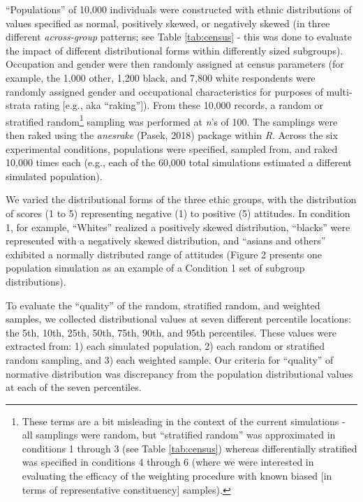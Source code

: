 \documentclass[
  ,man]{apa7}
\begin{document}
``Populations'' of 10,000 individuals were constructed with ethnic distributions of values specified as normal, positively skewed, or negatively skewed (in three different \emph{across-group} patterns; see Table \ref{tab:census} - this was done to evaluate the impact of different distributional forms within differently sized subgroups). Occupation and gender were then randomly assigned at census parameters (for example, the 1,000 other, 1,200 black, and 7,800 white respondents were randomly assigned gender and occupational characteristics for purposes of multi-strata rating {[}e.g., aka ``raking''{]}). From these 10,000 records, a random or stratified random\footnote{These terms are a bit misleading in the context of the current simulations - all samplings were random, but ``stratified random'' was approximated in conditions 1 through 3 (see Table \ref{tab:census}) whereas differentially stratified was specified in conditions 4 through 6 (where we were interested in evaluating the efficacy of the weighting procedure with known biased {[}in terms of representative constituency{]} samples).} sampling was performed at \emph{n}'s of 100. The samplings were then raked using the \emph{anesrake} (Pasek, 2018) package within \emph{R}. Across the six experimental conditions, populations were specified, sampled from, and raked 10,000 times each (e.g., each of the 60,000 total simulations estimated a different simulated population).

We varied the distributional forms of the three ethic groups, with the distribution of scores (1 to 5) representing negative (1) to positive (5) attitudes. In condition 1, for example, ``Whites'' realized a positively skewed distribution, ``blacks'' were represented with a negatively skewed distribution, and ``asians and others'' exhibited a normally distributed range of attitudes (Figure 2 presents one population simulation as an example of a Condition 1 set of subgroup distributions).

To evaluate the ``quality'' of the random, stratified random, and weighted samples, we collected distributional values at seven different percentile locations: the 5th, 10th, 25th, 50th, 75th, 90th, and 95th percentiles. These values were extracted from: 1) each simulated population, 2) each random or stratified random sampling, and 3) each weighted sample. Our criteria for ``quality'' of normative distribution was discrepancy from the population distributional values at each of the seven percentiles.
\end{document}
